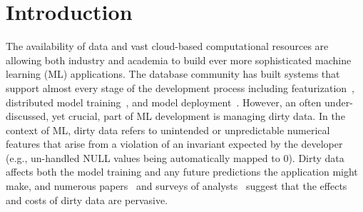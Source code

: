 \section{Introduction}\label{intro}\sloppy
The availability of data and vast cloud-based computational resources are allowing both industry and academia to build ever more sophisticated machine learning (ML) applications.
The database community has built systems that support almost every stage of the development process including featurization~\cite{keystone,zhang2014mat}, distributed model training~\cite{hellerstein2012madlib, crotty2014tupleware, feng2012towards, tensor}, and model deployment~\cite{crankshawmissing}.  
However, an often under-discussed, yet crucial, part of ML development is managing dirty data.
In the context of ML, dirty data refers to unintended or unpredictable numerical features that arise from a violation of an invariant expected by the developer (e.g., un-handled NULL values being automatically mapped to 0).
Dirty data affects both the model training and any future predictions the application might make, and numerous papers~\cite{sculley2014machine} and surveys of analysts~\cite{kandel2012, krishnan2016hilda} suggest that the effects and costs of dirty data are pervasive.

